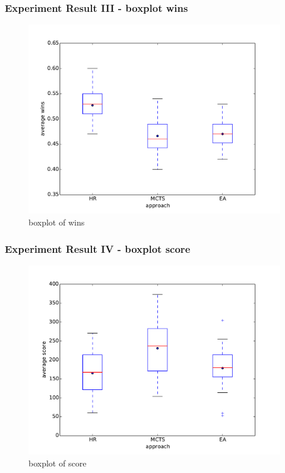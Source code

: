 \documentclass{beamer}
\begin{document}
\begin{frame}
\frametitle{Experiment Result III - boxplot wins}
\begin{figure}[H]
\centering
\includegraphics[scale=0.45]{../report/images/eval_all_wins.pdf}
\caption{boxplot of wins}
\label{box_eval_all_wins}
\end{figure}
\end{frame}


\begin{frame}
\frametitle{Experiment Result IV - boxplot score}
\begin{figure}[H]
\centering
\includegraphics[scale=0.45]{../report/images/eval_all_score.pdf}
\caption{boxplot of score}
\label{box_eval_all_score}
\end{figure}
\end{frame}
\end{document}
